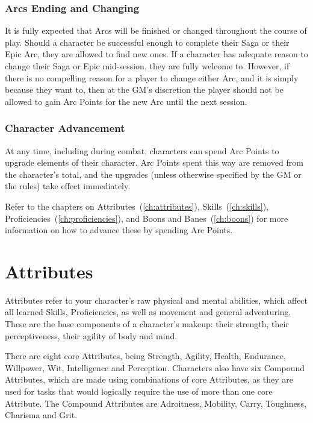 \documentclass[oneside,11pt,english]{book}
\begin{document}
\subsection{Arcs Ending and Changing}
It is fully expected that Arcs will be finished or changed throughout the course
of play. Should a character be successful enough to complete their Saga or their
Epic Arc, they are allowed to find new ones. If a character has adequate reason
to change their Saga or Epic mid-session, they are fully welcome to. However, if
there is no compelling reason for a player to change either Arc, and it is
simply because they want to, then at the GM’s discretion the player should not
be allowed to gain Arc Points for the new Arc until the next session.

\subsection{Character Advancement}
At any time, including during combat, characters can spend Arc Points to upgrade
elements of their character. Arc Points spent this way are removed from the
character’s total, and the upgrades (unless otherwise specified by the GM or the
rules) take effect immediately.

Refer to the chapters on Attributes~(\autoref{ch:attributes}),
Skills~(\autoref{ch:skills}), Proficiencies~(\autoref{ch:proficiencies}), and
Boons and Banes~(\autoref{ch:boons}) for more information on how to advance
these by spending Arc Points.

\chapter{Attributes}\label{ch:attributes}
\startcontents[chapters]
\clearpage
Attributes refer to your character’s raw physical and mental abilities, which
affect all learned Skills, Proficiencies, as well as movement and general
adventuring. These are the base components of a character’s makeup: their
strength, their perceptiveness, their agility of body and mind.

There are eight core Attributes, being Strength, Agility, Health, Endurance,
Willpower, Wit, Intelligence and Perception. Characters also have six Compound
Attributes, which are made using combinations of core Attributes, as they are
used for tasks that would logically require the use of more than one core
Attribute. The Compound Attributes are Adroitness, Mobility, Carry, Toughness,
Charisma and Grit.
\end{document}
